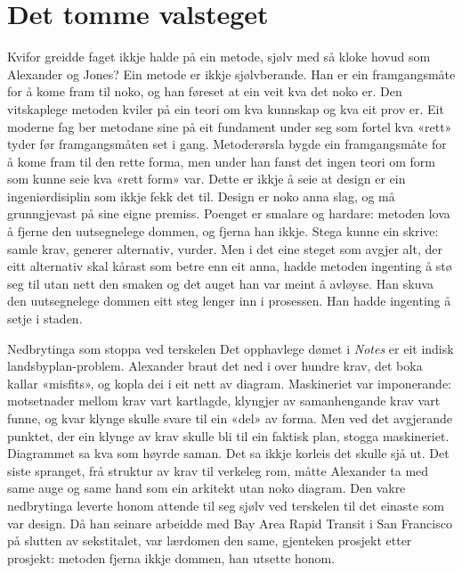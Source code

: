 \section{Det tomme valsteget}

Kvifor greidde faget ikkje halde på ein metode, sjølv med så kloke hovud som Alexander og Jones? Ein metode er ikkje sjølvberande. Han er ein framgangsmåte for å kome fram til noko, og han føreset at ein veit kva det noko er. Den vitskaplege metoden kviler på ein teori om kva kunnskap og kva eit prov er. Eit moderne fag ber metodane sine på eit fundament under seg som fortel kva «rett» tyder før framgangsmåten set i gang. Metoderørsla bygde ein framgangsmåte for å kome fram til den rette forma, men under han fanst det ingen teori om form som kunne seie kva «rett form» var. Dette er ikkje å seie at design er ein ingeniørdisiplin som ikkje fekk det til. Design er noko anna slag, og må grunngjevast på sine eigne premiss. Poenget er smalare og hardare: metoden lova å fjerne den uutsegnelege dommen, og fjerna han ikkje. Stega kunne ein skrive: samle krav, generer alternativ, vurder. Men i det eine steget som avgjer alt, der eitt alternativ skal kårast som betre enn eit anna, hadde metoden ingenting å stø seg til utan nett den smaken og det auget han var meint å avløyse. Han skuva den uutsegnelege dommen eitt steg lenger inn i prosessen. Han hadde ingenting å setje i staden.

\begin{kasus}{Nedbrytinga som stoppa ved terskelen}
Det opphavlege dømet i \textit{Notes} er eit indisk landsbyplan-problem. Alexander braut det ned i over hundre krav, det boka kallar «misfits», og kopla dei i eit nett av diagram. Maskineriet var imponerande: motsetnader mellom krav vart kartlagde, klyngjer av samanhengande krav vart funne, og kvar klynge skulle svare til ein «del» av forma. Men ved det avgjerande punktet, der ein klynge av krav skulle bli til ein faktisk plan, stogga maskineriet. Diagrammet sa kva som høyrde saman. Det sa ikkje korleis det skulle sjå ut. Det siste spranget, frå struktur av krav til verkeleg rom, måtte Alexander ta med same auge og same hand som ein arkitekt utan noko diagram. Den vakre nedbrytinga leverte honom attende til seg sjølv ved terskelen til det einaste som var design. Då han seinare arbeidde med Bay Area Rapid Transit i San Francisco på slutten av sekstitalet, var lærdomen den same, gjenteken prosjekt etter prosjekt: metoden fjerna ikkje dommen, han utsette honom.
\end{kasus}

